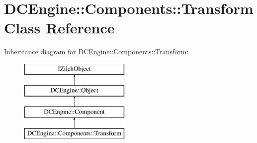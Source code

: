 \hypertarget{classDCEngine_1_1Components_1_1Transform}{\section{D\-C\-Engine\-:\-:Components\-:\-:Transform Class Reference}
\label{classDCEngine_1_1Components_1_1Transform}
}
Inheritance diagram for D\-C\-Engine\-:\-:Components\-:\-:Transform\-:\begin{figure}[H]
\begin{center}
\leavevmode
\includegraphics[height=4.000000cm]{classDCEngine_1_1Components_1_1Transform}
\end{center}
\end{figure}
